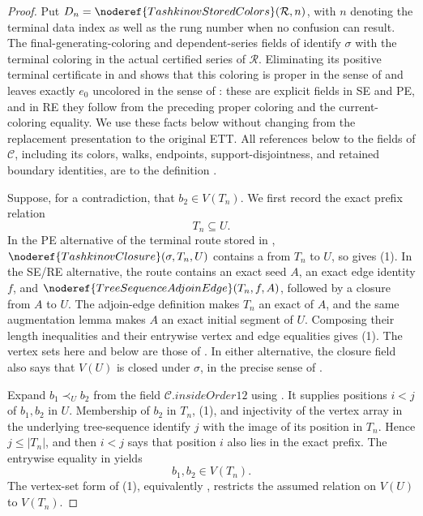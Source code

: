 \begin{proof}
Put \(D_n=\noderef{TashkinovStoredColors}(\mathcal R,n)\), with \(n\)
denoting the terminal data index as well as the rung number when no
confusion can result.  The final-generating-coloring and dependent-series
fields of  identify
\(\sigma\) with the terminal coloring in the actual certified series of
\(\mathcal R\).  Eliminating its positive terminal certificate in
 and  shows that
this coloring is proper in the sense of
 and leaves exactly \(e_0\) uncolored in
the sense of : these are explicit fields in
SE and PE, and in RE they follow from the preceding proper coloring and
the current-coloring equality.  We use these facts below without changing
from the replacement presentation to the original ETT.  All references
below to the fields of \(\mathcal C\), including its colors, walks,
endpoints, support-disjointness, and retained boundary identities, are to
the definition .

Suppose, for a contradiction, that \(b_2\in V(T_n)\).  We first record
the exact prefix relation
\[
                              T_n\subseteq U.                 \tag{1}
\]
In the PE alternative of the terminal route stored in
,
\(\noderef{TashkinovClosure}(\sigma,T_n,U)\) contains a
 from \(T_n\) to \(U\), so
 gives (1).  In the
SE/RE alternative, the route contains an exact seed \(A\), an exact edge
identity \(f\), and
\(\noderef{TreeSequenceAdjoinEdge}(T_n,f,A)\), followed by a closure
from \(A\) to \(U\).  The adjoin-edge definition makes \(T_n\) an exact
 of \(A\), and the same augmentation
lemma makes \(A\) an exact initial segment of \(U\).  Composing their
length inequalities and their entrywise vertex and edge equalities gives
(1).  The vertex sets here and below are those of
.  In either alternative, the closure
field also says that \(V(U)\) is closed under \(\sigma\), in the precise
sense of .

Expand \(b_1\prec_U b_2\) from the field
\(\mathcal C.\mathit{insideOrder12}\) using
.  It supplies positions \(i<j\) of \(b_1,b_2\)
in \(U\).  Membership of \(b_2\) in \(T_n\), (1), and injectivity of
the vertex array in the underlying tree-sequence identify \(j\) with the
image of its position in \(T_n\).  Hence \(j\leq |T_n|\), and then
\(i<j\) says that position \(i\) also lies in the exact prefix.  The
entrywise equality in  yields
\[
                         b_1,b_2\in V(T_n).                   \tag{2}
\]
The vertex-set form of (1), equivalently
, restricts the
assumed  relation on \(V(U)\) to
\(V(T_n)\).


\end{proof}
